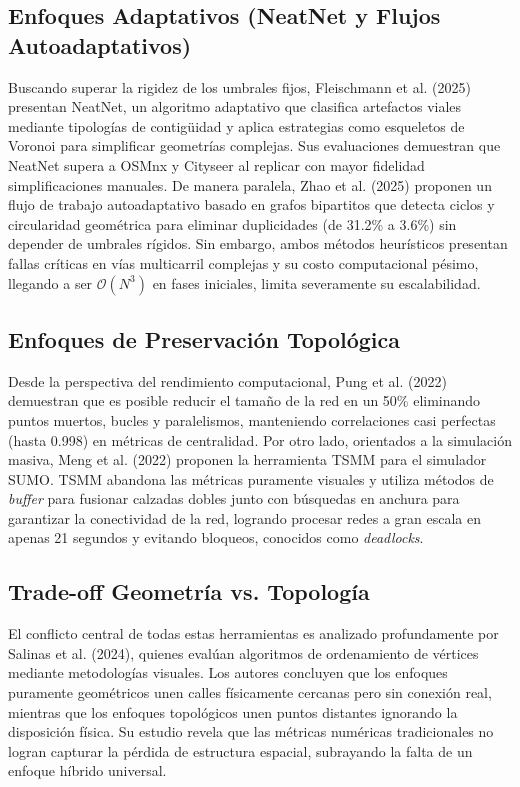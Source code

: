 \subsection{Enfoques Adaptativos (NeatNet y Flujos Autoadaptativos)}
Buscando superar la rigidez de los umbrales fijos, Fleischmann et al. (2025) presentan NeatNet, un algoritmo adaptativo que clasifica artefactos viales mediante tipologías de contigüidad y aplica estrategias como esqueletos de Voronoi para simplificar geometrías complejas. Sus evaluaciones demuestran que NeatNet supera a OSMnx y Cityseer al replicar con mayor fidelidad simplificaciones manuales. De manera paralela, Zhao et al. (2025) proponen un flujo de trabajo autoadaptativo basado en grafos bipartitos que detecta ciclos y circularidad geométrica para eliminar duplicidades (de 31.2\% a 3.6\%) sin depender de umbrales rígidos. Sin embargo, ambos métodos heurísticos presentan fallas críticas en vías multicarril complejas y su costo computacional pésimo, llegando a ser $\mathcal{O}(N^3)$ en fases iniciales, limita severamente su escalabilidad.

\subsection{Enfoques de Preservación Topológica}
Desde la perspectiva del rendimiento computacional, Pung et al. (2022) demuestran que es posible reducir el tamaño de la red en un 50\% eliminando puntos muertos, bucles y paralelismos, manteniendo correlaciones casi perfectas (hasta 0.998) en métricas de centralidad. Por otro lado, orientados a la simulación masiva, Meng et al. (2022) proponen la herramienta TSMM para el simulador SUMO. TSMM abandona las métricas puramente visuales y utiliza métodos de \textit{buffer} para fusionar calzadas dobles junto con búsquedas en anchura para garantizar la conectividad de la red, logrando procesar redes a gran escala en apenas 21 segundos y evitando bloqueos, conocidos como \textit{deadlocks}.

\subsection{Trade-off Geometría vs. Topología}
El conflicto central de todas estas herramientas es analizado profundamente por Salinas et al. (2024), quienes evalúan algoritmos de ordenamiento de vértices mediante metodologías visuales. Los autores concluyen que los enfoques puramente geométricos unen calles físicamente cercanas pero sin conexión real, mientras que los enfoques topológicos unen puntos distantes ignorando la disposición física. Su estudio revela que las métricas numéricas tradicionales no logran capturar la pérdida de estructura espacial, subrayando la falta de un enfoque híbrido universal.

